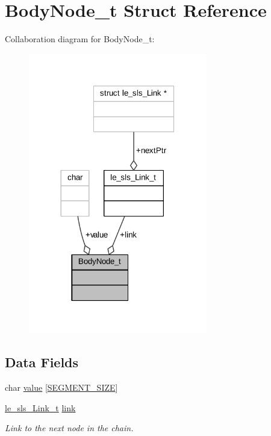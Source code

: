 \hypertarget{struct_body_node__t}{}\section{Body\+Node\+\_\+t Struct Reference}
\label{struct_body_node__t}


Collaboration diagram for Body\+Node\+\_\+t\+:
\nopagebreak
\begin{figure}[H]
\begin{center}
\leavevmode
\includegraphics[width=221pt]{struct_body_node__t__coll__graph}
\end{center}
\end{figure}
\subsection*{Data Fields}
\begin{DoxyCompactItemize}
\item 
char \hyperlink{struct_body_node__t_a1dd7010ad4ec13bd0e65e7eef308e731}{value} \mbox{[}\hyperlink{mk_patch_8c_acbe07a3c3fe2056125230c357f85b870}{S\+E\+G\+M\+E\+N\+T\+\_\+\+S\+I\+ZE}\mbox{]}
\item 
\hyperlink{structle__sls___link__t}{le\+\_\+sls\+\_\+\+Link\+\_\+t} \hyperlink{struct_body_node__t_a0a22f469d330f39146ebf523b6a0c2e2}{link}
\begin{DoxyCompactList}\small\item\em Link to the next node in the chain. \end{DoxyCompactList}\end{DoxyCompactItemize}


